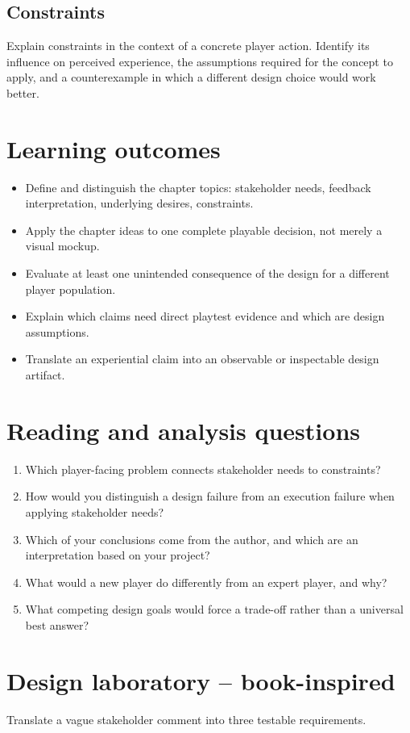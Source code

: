 \documentclass[11pt]{article}
\begin{document}
\subsection{Constraints}
Explain constraints in the context of a concrete player action. Identify its influence on perceived experience, the assumptions required for the concept to apply, and a counterexample in which a different design choice would work better.


\section{Learning outcomes}
\begin{itemize}
\item Define and distinguish the chapter topics: stakeholder needs, feedback interpretation, underlying desires, constraints.
\item Apply the chapter ideas to one complete playable decision, not merely a visual mockup.
\item Evaluate at least one unintended consequence of the design for a different player population.
\item Explain which claims need direct playtest evidence and which are design assumptions.
\item Translate an experiential claim into an observable or inspectable design artifact.
\end{itemize}

\section{Reading and analysis questions}
\begin{enumerate}
\item Which player-facing problem connects stakeholder needs to constraints?
\item How would you distinguish a design failure from an execution failure when applying stakeholder needs?
\item Which of your conclusions come from the author, and which are an interpretation based on your project?
\item What would a new player do differently from an expert player, and why?
\item What competing design goals would force a trade-off rather than a universal best answer?
\end{enumerate}

\section{Design laboratory -- book-inspired}
Translate a vague stakeholder comment into three testable requirements.
\end{document}
